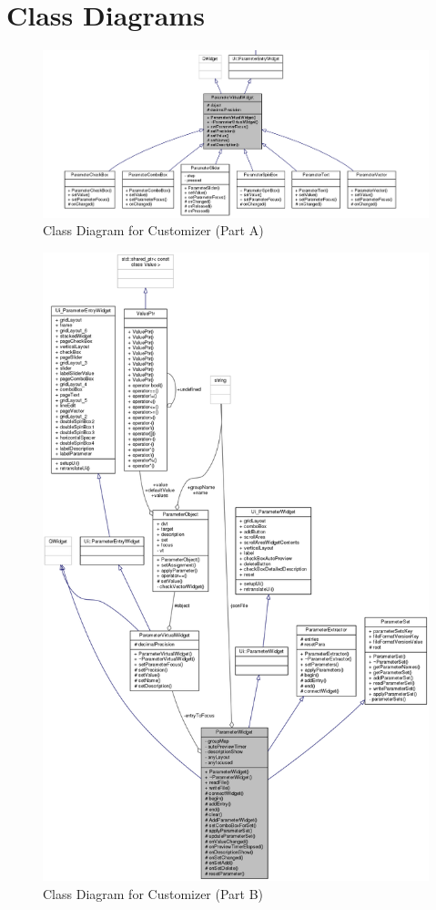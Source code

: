 \section{Class Diagrams}
\begin{figure}[H]
	\centering
	\includegraphics[width=1\linewidth]{images/collaborative1}
	\caption{Class Diagram for Customizer (Part A) }
	\label{fig:collaborative1}
\end{figure}
\begin{figure}[H]
	\centering
	\includegraphics[scale=0.40]{images/collaborative}
	\caption{Class Diagram for Customizer (Part B)}
	\label{fig:collaborative}
\end{figure}
